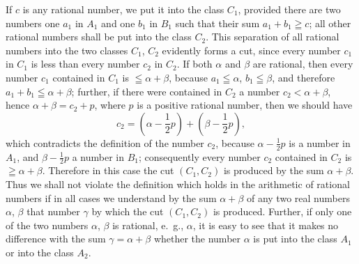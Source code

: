 \documentclass[oneside]{book}
\begin{document}
If $c$ is any rational number, we put it into the class
$C_1$, provided there are two numbers one $a_1$ in $A_1$ and
one $b_1$ in $B_1$ such that their sum $a_1+b_1 \geqq c$; all other
rational numbers shall be put into the class $C_2$. This
separation of all rational numbers into the two classes
$C_1$, $C_2$ evidently forms a cut, since every number $c_1$ in
$C_1$ is less than every number $c_2$ in $C_2$. If both $\alpha$ and
$\beta$ are rational, then every number $c_1$ contained in $C_1$ is
$\leqq\alpha+\beta$, because $a_1\leqq\alpha$, $b_1\leqq\beta$, and therefore $a_1+b_1
\leqq\alpha+\beta$; further, if there were contained in $C_2$ a number
$c_2<\alpha+\beta$, hence $\alpha+\beta=c_2+p$, where $p$ is a positive
rational number, then we should have
\[
c_2=(\alpha- \frac{1}{2} p)+(\beta- \frac{1}{2} p),
\]
which contradicts the definition of the number $c_2$, because
$\alpha- \frac{1}{2} p$ is a number in $A_1$, and $\beta- \frac{1}{2} p$ a number
in $B_1$; consequently every number $c_2$ contained in $C_2$
is $\geqq\alpha+\beta$. Therefore in this case the cut $(C_1, C_2)$ is
produced by the sum $\alpha+\beta$. Thus we shall not violate
the definition which holds in the arithmetic of rational
numbers if in all cases we understand by the sum
$\alpha+\beta$ of any two real numbers $\alpha$, $\beta$ that number $\gamma$ by
which the cut $(C_1, C_2)$ is produced. Further, if only
one of the two numbers $\alpha$, $\beta$ is rational, e.~g., $\alpha$, it is
easy to see that it makes no difference with the sum
$\gamma=\alpha+\beta$ whether the number $\alpha$ is put into the class
$A_1$ or into the class $A_2$.
\end{document}
